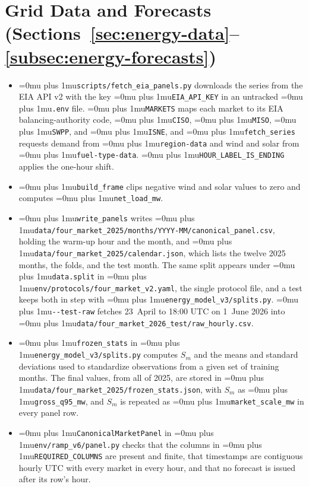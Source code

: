 \documentclass{UNCC-thesis}
\newcommand{\codepath}[1]{{\Urlmuskip=0mu plus 1mu\relax\nolinkurl{#1}}}
\begin{document}
\section{Grid Data and Forecasts (Sections~\ref{sec:energy-data}--\ref{subsec:energy-forecasts})}
\begin{itemize}
  \item \codepath{scripts/fetch_eia_panels.py} downloads the series from the
        EIA API v2 with the key \codepath{EIA_API_KEY} in an untracked
        \codepath{.env} file. \codepath{MARKETS} maps each market to its EIA
        balancing-authority code, \codepath{CISO},
        \codepath{MISO}, \codepath{SWPP}, and \codepath{ISNE}, and \codepath{fetch_series} requests demand from
        \codepath{region-data} and wind and solar from
        \codepath{fuel-type-data}. \codepath{HOUR_LABEL_IS_ENDING} applies the
        one-hour shift.
  \item \codepath{build_frame} clips negative wind and solar values to
        zero and computes \codepath{net_load_mw}.
  \item \codepath{write_panels} writes
        \codepath{data/four_market_2025/months/YYYY-MM/canonical_panel.csv},
        holding the warm-up hour and the month, and
        \codepath{data/four_market_2025/calendar.json}, which lists the
        twelve 2025 months, the folds, and the test month. The same split
        appears under \codepath{data.split} in
        \codepath{env/protocols/four_market_v2.yaml}, the single protocol
        file, and a test keeps both in step with
        \codepath{energy_model_v3/splits.py}. \codepath{--test-raw} fetches
        23~April to 18:00 UTC on 1~June 2026 into
        \codepath{data/four_market_2026_test/raw_hourly.csv}.
  \item \codepath{frozen_stats} in \codepath{energy_model_v3/splits.py}
        computes \(S_m\) and the means and standard deviations used to
        standardize observations from a given set of training months. The
        final values, from all of 2025, are stored in
        \codepath{data/four_market_2025/frozen_stats.json}, with \(S_m\) as
        \codepath{gross_q95_mw}, and \(S_m\) is repeated as
        \codepath{market_scale_mw} in every panel row.
  \item \codepath{CanonicalMarketPanel} in \codepath{env/ramp_v6/panel.py}
        checks that the columns in \codepath{REQUIRED_COLUMNS} are present and
        finite, that timestamps are contiguous hourly UTC with every market in
        every hour, and that no forecast is issued after its row's hour.

\end{itemize}
\end{document}

